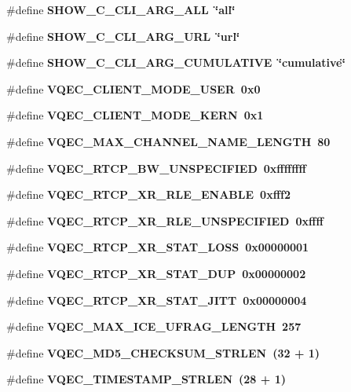 \begin{CompactItemize}
\item 
\#define \bf{SHOW\_\-C\_\-CLI\_\-ARG\_\-ALL}~\char`\"{}all\char`\"{}
\item 
\#define \bf{SHOW\_\-C\_\-CLI\_\-ARG\_\-URL}~\char`\"{}url\char`\"{}
\item 
\#define \bf{SHOW\_\-C\_\-CLI\_\-ARG\_\-CUMULATIVE}~\char`\"{}cumulative\char`\"{}
\item 
\#define \bf{VQEC\_\-CLIENT\_\-MODE\_\-USER}~0x0
\item 
\#define \bf{VQEC\_\-CLIENT\_\-MODE\_\-KERN}~0x1
\item 
\#define \bf{VQEC\_\-MAX\_\-CHANNEL\_\-NAME\_\-LENGTH}~80
\item 
\#define \bf{VQEC\_\-RTCP\_\-BW\_\-UNSPECIFIED}~0xffffffff
\item 
\#define \bf{VQEC\_\-RTCP\_\-XR\_\-RLE\_\-ENABLE}~0xfff2
\item 
\#define \bf{VQEC\_\-RTCP\_\-XR\_\-RLE\_\-UNSPECIFIED}~0xffff
\item 
\#define \bf{VQEC\_\-RTCP\_\-XR\_\-STAT\_\-LOSS}~0x00000001
\item 
\#define \bf{VQEC\_\-RTCP\_\-XR\_\-STAT\_\-DUP}~0x00000002
\item 
\#define \bf{VQEC\_\-RTCP\_\-XR\_\-STAT\_\-JITT}~0x00000004
\item 
\#define \bf{VQEC\_\-MAX\_\-ICE\_\-UFRAG\_\-LENGTH}~257
\item 
\#define \bf{VQEC\_\-MD5\_\-CHECKSUM\_\-STRLEN}~(32 + 1)
\item 
\#define \bf{VQEC\_\-TIMESTAMP\_\-STRLEN}~(28 + 1)
\end{CompactItemize}
